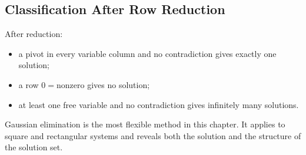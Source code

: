 \subsection{Classification After Row Reduction}

\begin{summarybox}
After reduction:
\begin{itemize}
\item a pivot in every variable column and no contradiction gives exactly one solution;
\item a row $0=\text{nonzero}$ gives no solution;
\item at least one free variable and no contradiction gives infinitely many solutions.
\end{itemize}
\end{summarybox}

Gaussian elimination is the most flexible method in this chapter. It applies to square and rectangular systems and reveals both the solution and the structure of the solution set.
